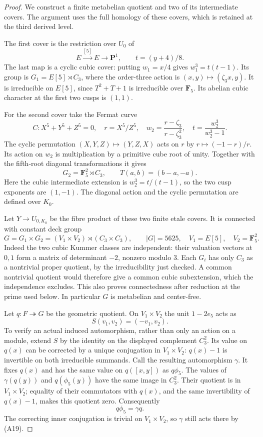 \begin{proof}
We construct a finite metabelian quotient and two of its
intermediate covers. The argument uses the full homology
of these covers, which is retained at the third derived
level.

The first cover is the restriction over $U_0$ of
\[
 E\xrightarrow{[5]}E\longrightarrow\mathbf P^1,
       \qquad t=(y+4)/8.
\]
The last map is a cyclic cubic cover: putting $w_1=x/4$
gives $w_1^3=t(t-1)$. Its group is
$G_1=E[5]\rtimes C_3$, where the order-three action is
$(x,y)\mapsto(\zeta_3x,y)$. It is irreducible on $E[5]$,
since $T^2+T+1$ is irreducible over $\mathbf F_5$.
Its abelian cubic character at the first two cusps is
$(1,1)$.

For the second cover take the Fermat curve
\[
 C:X^5+Y^5+Z^5=0,
 \quad r=X^5/Z^5,\quad
 w_2=\frac{r-\zeta_3}{r-\zeta_3^2},\quad
 t=\frac{w_2^3}{w_2^3-1}.
\]
The cyclic permutation $(X,Y,Z)\mapsto(Y,Z,X)$ acts
on $r$ by $r\mapsto(-1-r)/r$. Its action on $w_2$ is
multiplication by a primitive cube root of unity.
Together with the fifth-root diagonal transformations
it gives
\[
 G_2=\mathbf F_5^2\rtimes C_3,\qquad
 T(a,b)=(b-a,-a).
\]
Here the cubic intermediate extension is
$w_2^3=t/(t-1)$, so the two cusp exponents are $(1,-1)$.
The diagonal action and the cyclic permutation are defined
over $K_0$.

Let $Y\to U_{0,K_0}$ be the fibre product of these two
finite etale covers. It is connected with constant deck
group
\[
 G=G_1\times G_2
   =(V_1\times V_2)\rtimes(C_3\times C_3),
 \qquad |G|=5625,
 \quad V_1=E[5],\quad V_2=\mathbf F_5^2.
                                                               \tag{A18}
\]
Indeed the two cubic Kummer classes are independent:
their valuation vectors at $0,1$ form a matrix of
determinant $-2$, nonzero modulo $3$. Each $G_i$ has
only $C_3$ as a nontrivial proper quotient, by the
irreducibility just checked. A common nontrivial quotient
would therefore give a common cubic subextension, which
the independence excludes. This also proves connectedness
after reduction at the prime used below. In particular
$G$ is metabelian and center-free.

Let $q:F\twoheadrightarrow G$ be the geometric quotient.
On $V_1\times V_2$ the unit $1-2e_5$ acts as
\[
                 S(v_1,v_2)=(-v_1,v_2).                       \tag{A19}
\]
To verify an actual induced automorphism, rather than only
an action on a module, extend $S$ by the identity on the
displayed complement $C_3^2$. Its value on $q(x)$ can be
corrected by a unique conjugation in $V_1\times V_2$:
$q(x)-1$ is invertible on both irreducible summands.
Call the resulting automorphism $\gamma$. It fixes
$q(x)$ and has the same value on $q([x,y])$ as $q\phi_5$.
The values of $\gamma(q(y))$ and $q(\phi_5(y))$ have the
same image in $C_3^2$. Their quotient is in $V_1\times V_2$;
equality of their commutators with $q(x)$, and the same
invertibility of $q(x)-1$, makes this quotient zero.
Consequently
\[
                         q\phi_5=\gamma q.
\]
The correcting inner conjugation is trivial on $V_1\times V_2$,
so $\gamma$ still acts there by (A19).


\end{proof}
